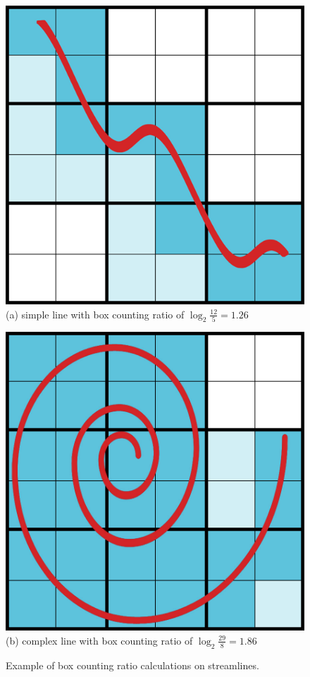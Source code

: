 \documentclass[journal]{vgtc}                %
\begin{document}
\begin{figure}[t]
	\centering
		\begin{minipage}{0.45\linewidth}
			\centering \small
			\includegraphics[height = .9\linewidth]{Images/line.png}\\(a) simple line with box counting ratio of $\log_2\frac{12}{5} = 1.26$\vspace{0.2em}
		\end{minipage}
		\begin{minipage}{0.45\linewidth}
			\centering \small
			\includegraphics[height = .9\linewidth]{Images/spiral.jpg}\\(b) complex line with box counting ratio of $\log_2\frac{29}{8} = 1.86$\vspace{0.2em}
		\end{minipage}
	\caption{Example of box counting ratio calculations on streamlines.}
	\label{fig:box_counting_calcs}
\end{figure}
\end{document}

